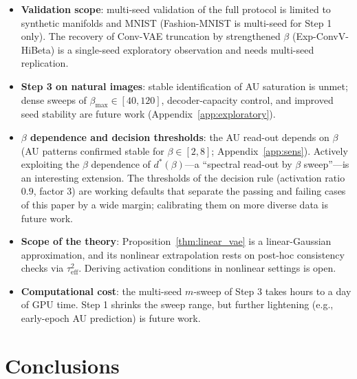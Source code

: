 \documentclass[make,article,submit,pdftex,moreauthors]{Definitions/mdpi}
\newcommand{\dstar}{d^{*}(\beta)}
\begin{document}
\begin{itemize}
  \item \textbf{Validation scope}: multi-seed validation of the full
        protocol is limited to synthetic manifolds and MNIST (Fashion-MNIST
        is multi-seed for Step 1 only).
        The recovery of Conv-VAE truncation by strengthened $\beta$
        (Exp-ConvV-HiBeta) is a single-seed exploratory observation and
        needs multi-seed replication.
  \item \textbf{Step 3 on natural images}: stable identification of AU
        saturation is unmet; dense sweeps of
        $\beta_{\max} \in [40, 120]$, decoder-capacity control, and improved
        seed stability are future work (Appendix~\ref{app:exploratory}).
  \item \textbf{$\beta$ dependence and decision thresholds}: the AU
        read-out depends on $\beta$
        (AU patterns confirmed stable for $\beta \in [2, 8]$;
        Appendix~\ref{app:sens}).
        Actively exploiting the $\beta$ dependence of $\dstar$---a
        ``spectral read-out by $\beta$ sweep''---is an interesting
        extension.
        The thresholds of the decision rule (activation ratio $0.9$, factor
        $3$) are working defaults that separate the passing and failing
        cases of this paper by a wide margin; calibrating them on more
        diverse data is future work.
  \item \textbf{Scope of the theory}: Proposition~\ref{thm:linear_vae} is a
        linear-Gaussian approximation, and its nonlinear extrapolation rests
        on post-hoc consistency checks via $\tau^2_{\mathrm{eff}}$.
        Deriving activation conditions in nonlinear settings is open.
  \item \textbf{Computational cost}: the multi-seed $m$-sweep of Step 3
        takes hours to a day of GPU time.
        Step 1 shrinks the sweep range, but further lightening (e.g.,
        early-epoch AU prediction) is future work.
\end{itemize}

\section{Conclusions}\label{sec:conclusion}
\end{document}
